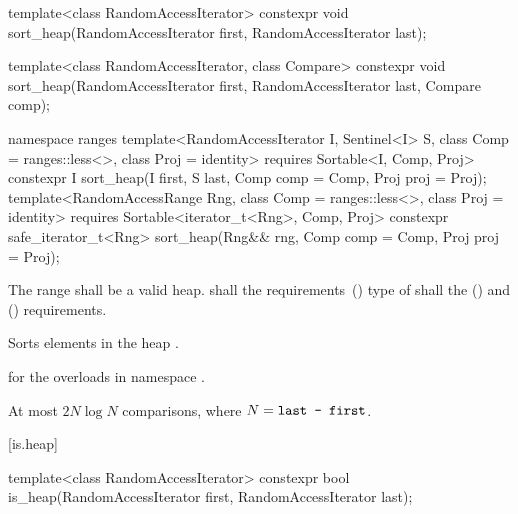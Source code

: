 %
\begin{itemdecl}
template<class RandomAccessIterator>
  constexpr void sort_heap(RandomAccessIterator first, RandomAccessIterator last);

template<class RandomAccessIterator, class Compare>
  constexpr void sort_heap(RandomAccessIterator first, RandomAccessIterator last,
                           Compare comp);
\end{itemdecl}
\begin{addedblock}
\begin{itemdecl}
namespace ranges {
  template<RandomAccessIterator I, Sentinel<I> S, class Comp = ranges::less<>,
      class Proj = identity>
    requires Sortable<I, Comp, Proj>
    constexpr I
      sort_heap(I first, S last, Comp comp = Comp{}, Proj proj = Proj{});
  template<RandomAccessRange Rng, class Comp = ranges::less<>, class Proj = identity>
    requires Sortable<iterator_t<Rng>, Comp, Proj>
    constexpr safe_iterator_t<Rng>
      sort_heap(Rng&& rng, Comp comp = Comp{}, Proj proj = Proj{});
}
\end{itemdecl}
\end{addedblock}

\begin{itemdescr}
\pnum
\requires The range  shall be a valid heap.
 shall  the
 requirements~()  type
of  shall  the
 () and
 () requirements.

\pnum
\effects
Sorts elements in the heap
.

\begin{addedblock}
\pnum
\returns
{} for the overloads in namespace .
\end{addedblock}

\pnum
\complexity
At most $2N \log N$
comparisons, where
$N = \texttt{last - first}$.
\end{itemdescr}


[is.heap]{}

%
\begin{itemdecl}
template<class RandomAccessIterator>
  constexpr bool is_heap(RandomAccessIterator first, RandomAccessIterator last);
\end{itemdecl}

